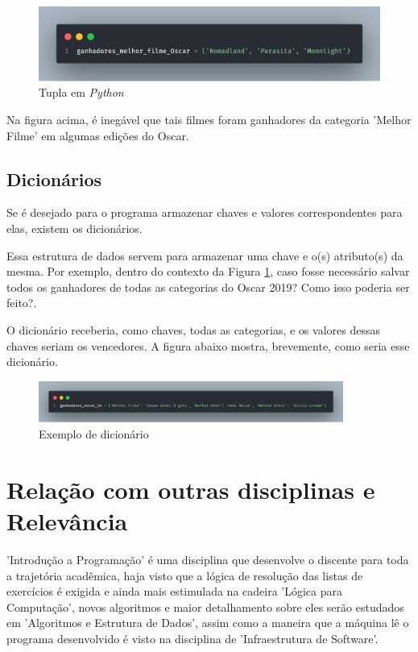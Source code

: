 \documentclass[a4paper, 12pt]{article} %
\begin{document}
\begin{figure}[ht]
    \centering
    \includegraphics[width = 13cm]{imagens/tupla.png}
    \caption{Tupla em \textit{Python}}
    \label{tuplas}
\end{figure}
Na figura acima, é inegável que tais filmes foram ganhadores da categoria 'Melhor Filme' em algumas edições do Oscar.

\subsection{Dicionários}

Se é desejado para o programa armazenar chaves e valores correspondentes para elas, existem os dicionários. 

Essa estrutura de dados servem para armazenar uma chave e o(s) atributo(s) da mesma. Por exemplo, dentro do contexto da Figura \ref{tuplas}, caso fosse necessário salvar todos os ganhadores de todas as categorias do Oscar 2019? Como isso poderia ser feito?. 

O dicionário receberia, como chaves, todas as categorias, e os valores dessas chaves seriam os vencedores. A figura abaixo mostra, brevemente, como seria esse dicionário. 

\begin{figure}[ht]
    \centering
    \includegraphics[width = 10cm]{imagens/dicionario.png}
    \caption{Exemplo de dicionário \cite{oscar}}
    \label{Dicionário}
\end{figure}

\section{Relação com outras disciplinas e Relevância}
'Introdução a Programação' é uma disciplina que desenvolve o discente para toda a trajetória acadêmica, haja visto que a lógica de resolução das listas de exercícios é exigida e ainda mais estimulada na cadeira 'Lógica para Computação', novos algoritmos e maior detalhamento sobre eles serão estudados em 'Algoritmos e Estrutura de Dados', assim como a maneira que a máquina lê o programa desenvolvido é visto na disciplina de 'Infraestrutura de Software'. 
\end{document}
